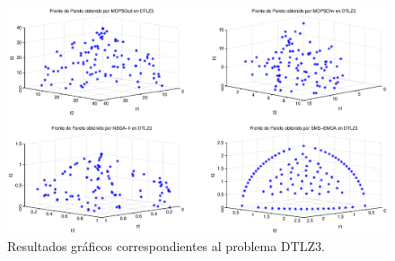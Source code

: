 \begin{figure}
      \begin{center}
	  \includegraphics[scale=0.45]{Cap4/rdtlz3r.eps}
      \end{center}
	\caption{Resultados gr\'aficos correspondientes al problema DTLZ3.}
      \label{fig:rDTLZ3}
      \end{figure}

      \clearpage
      \newpage
 

